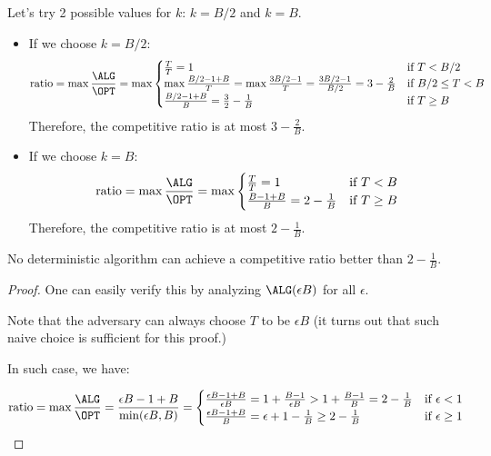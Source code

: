 Let's try 2 possible values for $k$: $k = B/2$ and $k = B$.

\begin{itemize}
	\item If we choose $k = B/2$:
	      \[ \text{ratio} = \max\frac{\ALG}{\OPT} = \max\begin{cases}
			      \frac{T}{T} = 1                                                                             & \text{if } T < B/2        \\
			      \max\frac{B/2 - 1 + B}{T} = \max\frac{3B/2 - 1}{T} = \frac{3B/2 - 1}{B/2} = 3 - \frac{2}{B} & \text{if } B/2 \leq T < B \\
			      \frac{B/2 - 1 + B}{B} = \frac{3}{2} - \frac{1}{B}                                           & \text{if } T \geq B
		      \end{cases} \]
	      Therefore, the competitive ratio is at most $3 - \frac{2}{B}$.

	\item If we choose $k = B$:
	      \[ \text{ratio} = \max\frac{\ALG}{\OPT} = \max\begin{cases}
			      \frac{T}{T} = 1                       & \text{if } T < B    \\
			      \frac{B - 1 + B}{B} = 2 - \frac{1}{B} & \text{if } T \geq B
		      \end{cases} \]
	      Therefore, the competitive ratio is at most $2 - \frac{1}{B}$.
\end{itemize}

\begin{theorem}
	No deterministic algorithm can achieve a competitive ratio better than $2 - \frac{1}{B}$.
\end{theorem}

\begin{proof}
	One can easily verify this by analyzing $\ALG(\epsilon B)$ for all $\epsilon$.

	Note that the adversary can always choose $T$ to be $\epsilon B$ (it turns out that such naive choice is sufficient for this proof.)

	In such case, we have:

	\[ \text{ratio} = \max\frac{\ALG}{\OPT} = \frac{\epsilon B - 1 + B}{\min(\epsilon B, B)} = \begin{cases}
			\frac{\epsilon B - 1 + B}{\epsilon B} = 1 + \frac{B - 1}{\epsilon B} > 1 + \frac{B - 1}{B} = 2 - \frac{1}{B} & \text{if } \epsilon < 1    \\
			\frac{\epsilon B - 1 + B}{B} = \epsilon + 1 - \frac{1}{B} \geq 2 - \frac{1}{B}                               & \text{if } \epsilon \geq 1
		\end{cases} \]
\end{proof}

